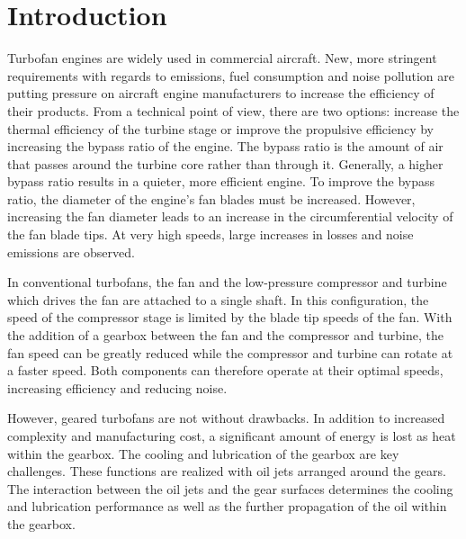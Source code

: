 \cleardoublepage


\chapter{Introduction}
\label{Chapter: Introduction}

Turbofan engines are widely used in commercial aircraft.  New, more stringent requirements with regards to emissions, fuel consumption and noise pollution are putting pressure on aircraft engine manufacturers to increase the efficiency of their products. From a technical point of view, there are two options: increase the thermal efficiency of the turbine stage or improve the propulsive efficiency by increasing the bypass ratio of the engine. The bypass ratio is the amount of air that passes around the turbine core rather than through it.  Generally, a higher bypass ratio results in a quieter, more efficient engine. To improve the bypass ratio, the diameter of the engine's fan blades must be increased.  However, increasing the fan diameter leads to an increase in the circumferential velocity of the fan blade tips.  At very high speeds, large increases in losses and noise emissions are observed.

In conventional turbofans, the fan and the low-pressure compressor and turbine which drives the fan are attached to a single shaft.  In this configuration, the speed of the compressor stage is limited by the blade tip speeds of the fan.  With the addition of a gearbox between the fan and the compressor and turbine, the fan speed can be greatly reduced while the compressor and turbine can rotate at a faster speed.  Both components can therefore operate at their optimal speeds, increasing efficiency and reducing noise.

However, geared turbofans are not without drawbacks.  In addition to increased complexity and manufacturing cost, a significant amount of energy is lost as heat within the gearbox.  The cooling and lubrication of the gearbox are key challenges.  These functions are realized with oil jets arranged around the gears.  The interaction between the oil jets and the gear surfaces determines the cooling and lubrication performance as well as the further propagation of the oil within the gearbox.


